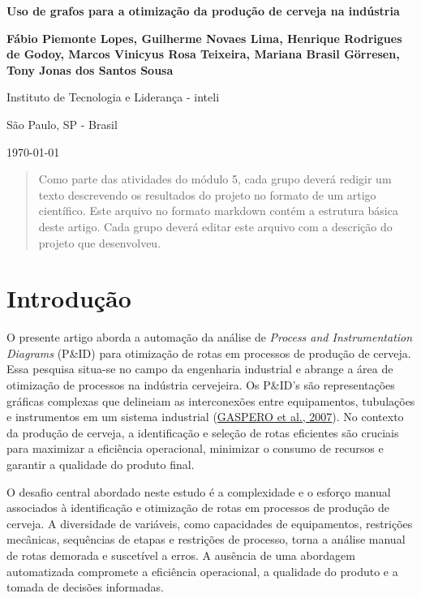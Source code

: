 \begingroup
\begin{center}
\fontsize{16pt}{16pt}\selectfont
\textbf{Uso de grafos para a otimização da produção de cerveja na indústria}
\end{center}
\endgroup
\vspace{1cm}
\begingroup
\begin{center}
\fontsize{12pt}{12pt}\selectfont

\textbf{Fábio Piemonte Lopes, Guilherme Novaes Lima, Henrique Rodrigues de Godoy, Marcos Vinicyus Rosa Teixeira, Mariana Brasil Görresen, Tony Jonas dos Santos Sousa}

\vspace{0.5cm}

Instituto de Tecnologia e Liderança - inteli

São Paulo, SP - Brasil

\today
\end{center}
\endgroup

\vspace{3cm}
\begin{abstract}
Como parte das atividades do módulo 5, cada grupo deverá redigir um texto descrevendo os resultados do projeto no formato de um artigo científico. Este arquivo no formato markdown contém a estrutura básica deste artigo. Cada grupo deverá editar este arquivo com a descrição do projeto que desenvolveu.
\end{abstract}

\pagebreak

\section{Introdução}\label{introduuxe7uxe3o}

O presente artigo aborda a automação da análise de \emph{Process and
Instrumentation Diagrams} (P\&ID) para otimização de rotas em processos
de produção de cerveja. Essa pesquisa situa-se no campo da engenharia
industrial e abrange a área de otimização de processos na indústria
cervejeira. Os P\&ID's são representações gráficas complexas que
delineiam as interconexões entre equipamentos, tubulações e instrumentos
em um sistema industrial
(\hyperref[referuxeancias-bibliogruxe1ficas]{GASPERO et al., 2007}). No
contexto da produção de cerveja, a identificação e seleção de rotas
eficientes são cruciais para maximizar a eficiência operacional,
minimizar o consumo de recursos e garantir a qualidade do produto final.

O desafio central abordado neste estudo é a complexidade e o esforço
manual associados à identificação e otimização de rotas em processos de
produção de cerveja. A diversidade de variáveis, como capacidades de
equipamentos, restrições mecânicas, sequências de etapas e restrições de
processo, torna a análise manual de rotas demorada e suscetível a erros.
A ausência de uma abordagem automatizada compromete a eficiência
operacional, a qualidade do produto e a tomada de decisões informadas.


